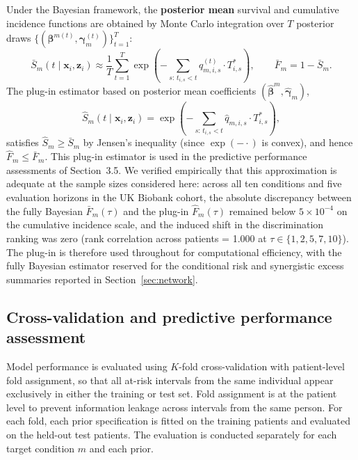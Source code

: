 \documentclass[12pt]{article}
\begin{document}
Under the Bayesian framework, the \textbf{posterior mean} survival and 
cumulative incidence functions are obtained by Monte Carlo integration over 
$T$ posterior draws $\{(\boldsymbol{\beta}^{m(t)}, \boldsymbol{\gamma}_m^{(t)}
)\}_{t=1}^T$:
\[
\bar{S}_m(t \mid \mathbf{x}_i, \mathbf{z}_i)
\approx \frac{1}{T}\sum_{t=1}^T
\exp\!\left(-\sum_{s:\, t_{i,s} < t} q^{(t)}_{m,i,s}\cdot T_{i,s}^*\right),
\qquad
\bar{F}_m = 1 - \bar{S}_m.
\]
The plug-in estimator based on posterior mean coefficients 
$(\hat{\boldsymbol{\beta}}^m, \hat{\boldsymbol{\gamma}}_m)$,
\[
\hat{S}_m(t \mid \mathbf{x}_i, \mathbf{z}_i)
= \exp\!\left(-\sum_{s:\, t_{i,s} < t} \hat{q}_{m,i,s}\cdot T_{i,s}^*\right),
\]
satisfies $\hat{S}_m \geq \bar{S}_m$ by Jensen's inequality (since $\exp(-\cdot)$ 
is convex), and hence $\hat{F}_m \leq \bar{F}_m$. This plug-in estimator is used 
in the predictive performance assessments of Section~3.5. We verified empirically that
this approximation is adequate at the sample sizes considered here: across all
ten conditions and five evaluation horizons in the UK Biobank cohort, the
absolute discrepancy between the fully Bayesian $\bar{F}_m(\tau)$ and the
plug-in $\hat{F}_m(\tau)$ remained below $5 \times 10^{-4}$ on the cumulative
incidence scale, and the induced shift in the discrimination ranking was zero
(rank correlation across patients = 1.000 at $\tau \in \{1,2,5,7,10\}$). The
plug-in is therefore used throughout for computational efficiency, with the
fully Bayesian estimator reserved for the conditional risk and synergistic
excess summaries reported in Section~\ref{sec:network}.


\subsection{Cross-validation and predictive performance assessment}

Model performance is evaluated using $K$-fold cross-validation with patient-level fold assignment, so that all at-risk intervals from the same individual appear exclusively in either the training or test set. Fold assignment is at the patient level to prevent information leakage across intervals from the same person. For each fold, each prior specification is fitted on the training patients and evaluated on the held-out test patients. The evaluation is conducted separately for each target condition $m$ and each prior.
\end{document}
